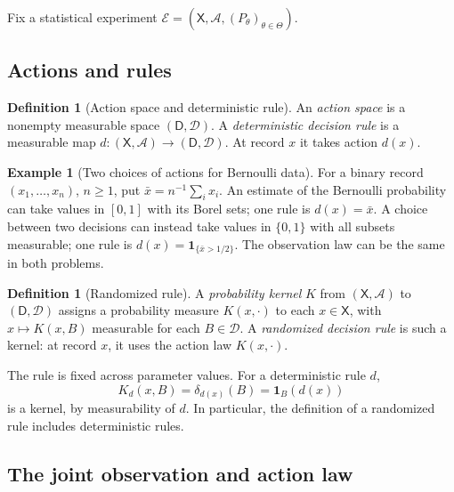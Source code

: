 \documentclass[11pt,oneside]{book}
\theoremstyle{definition}
\newtheorem{definition}[theorem]{Definition}
\newtheorem{example}[theorem]{Example}
\theoremstyle{remark}
\begin{document}
Fix a statistical experiment
$\mathcal E=(\mathsf X,\mathcal A,(P_\theta)_{\theta\in\Theta})$.

\subsection{Actions and rules}
\label{subsec:actions-rules}

\begin{definition}[Action space and deterministic rule]
\label{def:deterministic-rule}
An \emph{action space} is a nonempty measurable space
$(\mathsf D,\mathcal D)$. A \emph{deterministic decision rule} is a
measurable map $d:(\mathsf X,\mathcal A)\to(\mathsf D,\mathcal D)$.
At record $x$ it takes action $d(x)$.
\end{definition}

\begin{example}[Two choices of actions for Bernoulli data]
\label{ex:bernoulli-decision-actions}
For a binary record $(x_1,\ldots,x_n)$, $n\geq1$, put $\bar x=n^{-1}\sum_i x_i$.
An estimate of the Bernoulli probability can take values in $[0,1]$
with its Borel sets; one rule is $d(x)=\bar x$. A choice between two
decisions can instead take values in $\{0,1\}$ with all subsets measurable;
one rule is $d(x)=\mathbf 1_{\{\bar x>1/2\}}$. The observation law can be
the same in both problems.
\end{example}

\begin{definition}[Randomized rule]
\label{def:randomized-rule}
A \emph{probability kernel} $K$ from $(\mathsf X,\mathcal A)$ to
$(\mathsf D,\mathcal D)$ assigns a probability measure $K(x,\cdot)$ to
each $x\in\mathsf X$, with $x\mapsto K(x,B)$ measurable for each
$B\in\mathcal D$. A \emph{randomized decision rule} is such a kernel:
at record $x$, it uses the action law $K(x,\cdot)$.
\end{definition}

The rule is fixed across parameter values. For a deterministic rule $d$,
\[
K_d(x,B)=\delta_{d(x)}(B)=\mathbf 1_B(d(x))
\]
is a kernel, by measurability of $d$. In particular, the definition of a
randomized rule includes deterministic rules.

\subsection{The joint observation and action law}
\label{subsec:joint-action-law}
\end{document}
